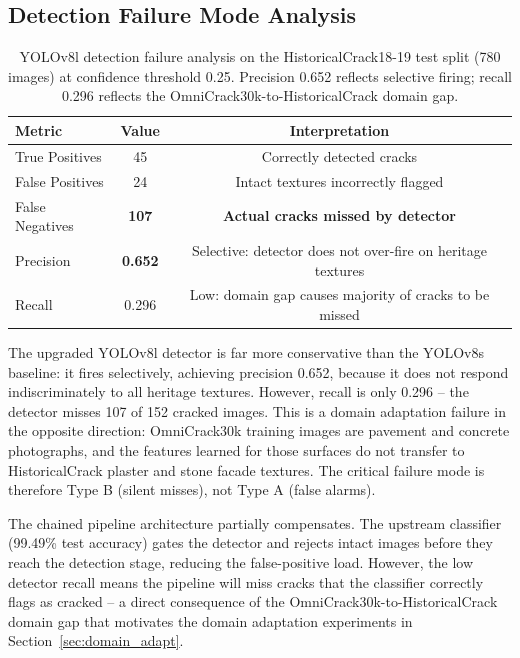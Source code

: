 \documentclass[12pt,a4paper]{article}
\begin{document}
\subsection{Detection Failure Mode Analysis}

\begin{table}[H]
\centering
\caption{YOLOv8l detection failure analysis on the HistoricalCrack18-19 test split (780 images) at confidence threshold 0.25. Precision 0.652 reflects selective firing; recall 0.296 reflects the OmniCrack30k-to-HistoricalCrack domain gap.}
\label{tab:det_fail}
\begin{tabular}{lcc}
\toprule
\rowcolor{white}
\textbf{Metric} & \textbf{Value} & \textbf{Interpretation} \\
\midrule
True Positives & 45 & Correctly detected cracks \\
False Positives & 24 & Intact textures incorrectly flagged \\
False Negatives & \textbf{107} & \textbf{Actual cracks missed by detector} \\
Precision & \textbf{0.652} & Selective: detector does not over-fire on heritage textures \\
Recall & 0.296 & Low: domain gap causes majority of cracks to be missed \\
\bottomrule
\end{tabular}
\end{table}

The upgraded YOLOv8l detector is far more conservative than the YOLOv8s baseline: it fires selectively, achieving precision 0.652, because it does not respond indiscriminately to all heritage textures. However, recall is only 0.296 -- the detector misses 107 of 152 cracked images. This is a domain adaptation failure in the opposite direction: OmniCrack30k training images are pavement and concrete photographs, and the features learned for those surfaces do not transfer to HistoricalCrack plaster and stone facade textures. The critical failure mode is therefore Type B (silent misses), not Type A (false alarms).

The chained pipeline architecture partially compensates. The upstream classifier (99.49\% test accuracy) gates the detector and rejects intact images before they reach the detection stage, reducing the false-positive load. However, the low detector recall means the pipeline will miss cracks that the classifier correctly flags as cracked -- a direct consequence of the OmniCrack30k-to-HistoricalCrack domain gap that motivates the domain adaptation experiments in Section~\ref{sec:domain_adapt}.
\end{document}
